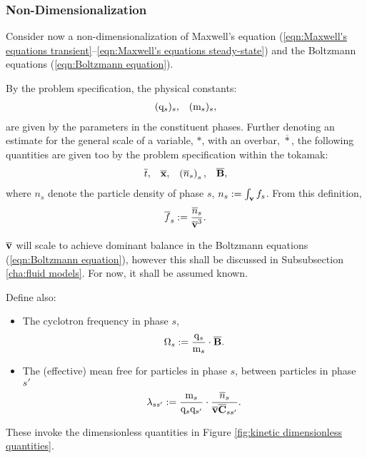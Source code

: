 \subsubsection{Non-Dimensionalization}
    Consider now a non-dimensionalization of Maxwell's equation (\ref{eqn:Maxwell's equations transient}--\ref{eqn:Maxwell's equations steady-state}) and the Boltzmann equations (\ref{eqn:Boltzmann equation}).
    
    By the problem specification, the physical constants:
    \begin{align}
        (\mathrm{q}_{s})_{s},  &&
        (\mathrm{m}_{s})_{s},
    \end{align}
    are given by the parameters in the constituent phases. Further denoting an estimate for the general scale of a variable, $*$, with an overbar, $\overline{*}$, the following quantities are given too by the problem specification within the tokamak:
    \begin{align}
        \overline{t},                       &&
        \overline{\mathbf{x}},                    &&
        \left(\overline{n}_{s}\right)_{s},  &&
        \overline{\mathbf{B}},
    \end{align}
    where $n_{s}$ denote the particle density of phase $s$, $n_{s}  :=  \int_{\mathbf{v}}f_{s}$. From this definition,
    \begin{equation}
        \overline{f}_{s}  :=  \frac{\overline{n}_{s}}{\overline{\mathbf{v}}^{3}}.
    \end{equation}

    $\overline{\mathbf{v}}$ will scale to achieve dominant balance in the Boltzmann equations (\ref{eqn:Boltzmann equation}), however this shall be discussed in Subsubsection \ref{cha:fluid models}. For now, it shall be assumed known.

    Define also:
    \begin{itemize}
        \item  The cyclotron frequency in phase $s$,
        \begin{equation}
            \Omega_{s}  :=  \frac{\mathrm{q}_{s}}{\mathrm{m}_{s}}\cdot\overline{\mathbf{B}}.
        \end{equation}
        \item  The (effective) mean free for particles in phase $s$, between particles in phase $s'$
        \begin{equation}
            \lambda_{ss'}  :=  \frac{\mathrm{m}_{s}}{\mathrm{q}_{s}\mathrm{q}_{s'}}\cdot\frac{\overline{n}_{s}}{\overline{\mathbf{v}}\overline{\mathbf{C}}_{ss'}}.
        \end{equation}
    \end{itemize}
    These invoke the dimensionless quantities in Figure \ref{fig:kinetic dimensionless quantities}.

